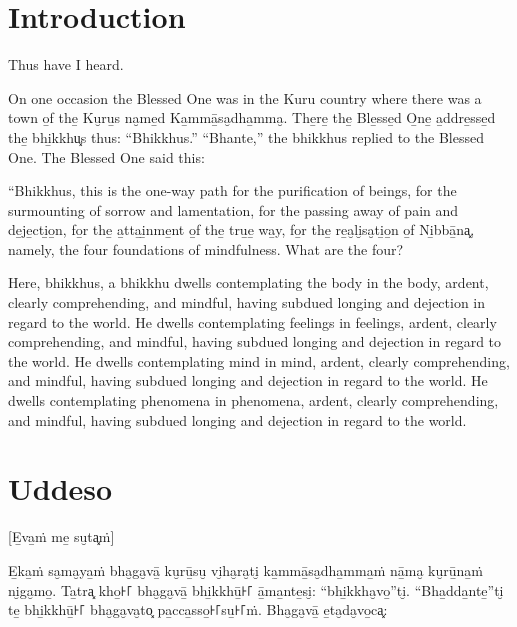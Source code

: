 \newcommand\englishPage{%
  \clearpage%
  \englishText%
}

\newcommand\paliPage{%
  \clearpage%
  \paliText%
}

\renewcommand{\englishTitle}{The Foundations of Mindfulness}
\renewcommand{\paliTitle}{Mahāsatipaṭṭhāna Sutta}

\englishPage
\chapter{Introduction}

Thus have I heard.

On one occasion the Blessed One was in the Kuru country where there was a town
o̱f the̱ Ku̮ru̱s na̮me̱d Ka̱mmā̱sa̮dha̱mma̮. The̱re̱ the̱ Ble̱sse̱d O̱ne̱ a̱ddre̱sse̱d the̱ bhi̱kkhu͓s
thus: “Bhikkhus.” “Bhante,” the bhikkhus replied to the Blessed One. The Blessed
One said this:

“Bhikkhus, this is the one-way path for the purification of beings, for the
surmounting of sorrow and lamentation, for the passing away of pain and
de̱je̱cti̱o̱n, fo̱r the̱ a̱tta̱i̱nme̱nt o̱f the̱ tru̱e̱ wa̱y, fo̱r the̱ re̱a̮li̮sa̮ti̱o̱n o̱f Ni̱bbā̱na͓,
namely, the four foundations of mindfulness. What are the four?

Here, bhikkhus, a bhikkhu dwells contemplating the body in the body, ardent,
clearly comprehending, and mindful, having subdued longing and dejection in
regard to the world. He dwells contemplating feelings in feelings, ardent,
clearly comprehending, and mindful, having subdued longing and dejection in
regard to the world. He dwells contemplating mind in mind, ardent, clearly
comprehending, and mindful, having subdued longing and dejection in regard to
the world. He dwells contemplating phenomena in phenomena, ardent, clearly
comprehending, and mindful, having subdued longing and dejection in regard to
the world.


\paliPage
\chapter*{Uddeso}

[E̱va̱ṁ me̱ su̮ta͓ṁ]

E̱ka̱ṁ sa̮ma̮ya̱ṁ bha̮ga̮vā̱ ku̮rū̱su̮ vi̮ha̮ra̮ti̮ ka̱mmā̱sa̮dha̱mma̱ṁ nā̱ma̮ ku̮rū̱na̱ṁ ni̮ga̮mo̱. Ta̱tra͓
kho̱꜔꜒ bha̮ga̮vā̱ bhi̱kkhū̱꜔꜒ ā̱ma̱nte̱si̮: “bhi̱kkha̮vo̱”ti̮. “Bha̱dda̱nte̱”ti̮ te̱ bhi̱kkhū̱꜔꜒ bha̮ga̮va̮to͓
pa̱cca̱sso̱꜔꜒su̱꜔꜒ṁ. Bha̮ga̮vā̱ e̱ta̮da̮vo̱ca͓:

